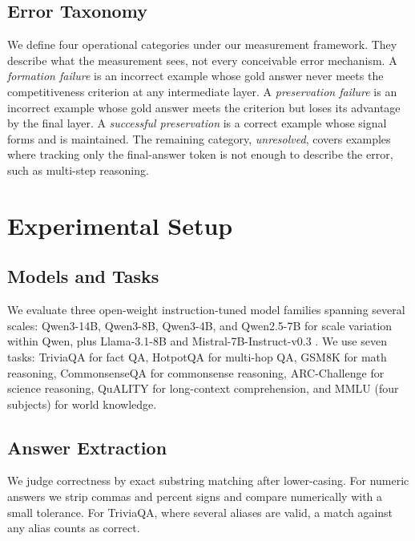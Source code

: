 \documentclass{article} %
\begin{document}
\subsection{Error Taxonomy}
We define four operational categories under our measurement framework. They describe what the measurement sees, not every conceivable error mechanism. A \emph{formation failure} is an incorrect example whose gold answer never meets the competitiveness criterion at any intermediate layer. A \emph{preservation failure} is an incorrect example whose gold answer meets the criterion but loses its advantage by the final layer. A \emph{successful preservation} is a correct example whose signal forms and is maintained. The remaining category, \emph{unresolved}, covers examples where tracking only the final-answer token is not enough to describe the error, such as multi-step reasoning.

\section{Experimental Setup}

\subsection{Models and Tasks}
We evaluate three open-weight instruction-tuned model families spanning several scales: Qwen3-14B, Qwen3-8B, Qwen3-4B, and Qwen2.5-7B for scale variation within Qwen, plus Llama-3.1-8B \citep{dubey2024llama} and Mistral-7B-Instruct-v0.3 \citep{jiang2023mistral}. We use seven tasks: TriviaQA \citep{joshi2017triviaqa} for fact QA, HotpotQA \citep{yang2018hotpotqa} for multi-hop QA, GSM8K \citep{cobbe2021gsm8k} for math reasoning, CommonsenseQA for commonsense reasoning, ARC-Challenge for science reasoning, QuALITY for long-context comprehension, and MMLU (four subjects) for world knowledge.

\subsection{Answer Extraction}
We judge correctness by exact substring matching after lower-casing. For numeric answers we strip commas and percent signs and compare numerically with a small tolerance. For TriviaQA, where several aliases are valid, a match against any alias counts as correct.
\end{document}
